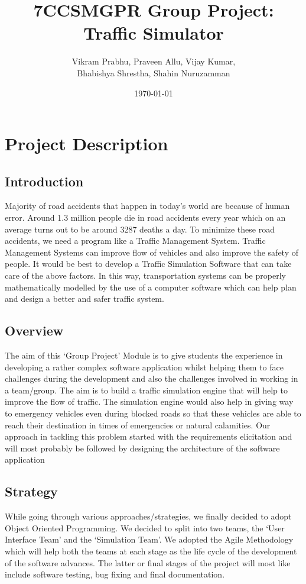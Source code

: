 \documentclass[11pt]{article}
\title{\textbf{7CCSMGPR Group Project: Traffic Simulator}}
\author{Vikram Prabhu, Praveen Allu, Vijay Kumar,\\ 
Bhabishya Shrestha, Shahin Nuruzamman}
\date{\today}
\begin{document}
\maketitle

\section{Project Description}

\subsection{Introduction}

Majority of road accidents that happen in today’s world are because of human error. Around 1.3 million people die in road accidents every year which on an average turns out to be around 3287 deaths a day. To minimize these road accidents, we need a program like a Traffic Management System. Traffic Management Systems can improve flow of vehicles and also improve the safety of people. It would be best to develop a Traffic Simulation Software that can take care of the above factors. In this way, transportation systems can be properly mathematically modelled by the use of a computer software which can help plan and design a better and safer traffic system.


\subsection{Overview}

The aim of this ‘Group Project’ Module is to give students the experience in developing a rather complex software application whilst helping them to face challenges during the development and also the challenges involved in working in a team/group. The aim is to build a traffic simulation engine that will help to improve the flow of traffic. The simulation engine would also help in giving way to emergency vehicles even during blocked roads so that these vehicles are able to reach their destination in times of emergencies or natural calamities. 
Our approach in tackling this problem started with the requirements elicitation and will most probably be followed by designing the architecture of the software application


\subsection{Strategy}

While going through various approaches/strategies, we finally decided to adopt Object Oriented Programming. We decided to split into two teams, the ‘User Interface Team’ and the ‘Simulation Team’. We adopted the Agile Methodology which will help both the teams at each stage as the life cycle of the development of the software advances. The latter or final stages of the project will most like include software testing, bug fixing and final documentation.
\end{document}
